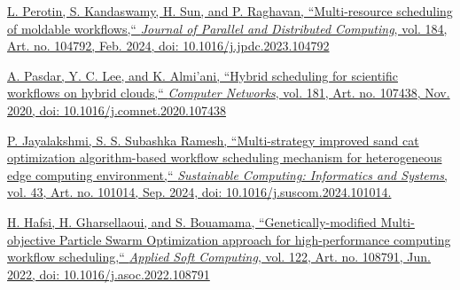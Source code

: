 \documentclass[a4paper, final]{article}
\begin{document}
\begin{thebibliography}{0}
    \href{https://doi.org/10.1016/j.jpdc.2023.104792}{
    L. Perotin, S. Kandaswamy, H. Sun, and P. Raghavan,
    ``Multi-resource scheduling of moldable workflows,``  
    \textit{Journal of Parallel and Distributed Computing}, vol. 184, Art. no. 104792, Feb. 2024,
    doi: 10.1016/j.jpdc.2023.104792
    }
    
	\href{https://doi.org/10.1016/j.comnet.2020.107438}{
    A. Pasdar, Y. C. Lee, and K. Almi’ani,
    ``Hybrid scheduling for scientific workflows on hybrid clouds,``
    \textit{Computer Networks}, vol. 181, Art. no. 107438, Nov. 2020,
    doi: 10.1016/j.comnet.2020.107438
    }
    
    \href{https://doi.org/10.1016/j.suscom.2024.101014}{
    P. Jayalakshmi, S. S. Subashka Ramesh,
    ``Multi-strategy improved sand cat optimization algorithm-based workflow scheduling mechanism for
    heterogeneous edge computing environment,``
    \textit{Sustainable Computing: Informatics and Systems}, vol. 43, Art. no. 101014, Sep. 2024,
    doi: 10.1016/j.suscom.2024.101014.
    }
    
	\href{https://doi.org/10.1016/j.asoc.2022.108791}{
    H. Hafsi, H. Gharsellaoui, and S. Bouamama,
    ``Genetically-modified Multi-objective Particle Swarm Optimization approach for high-performance 
    computing workflow scheduling,``
    \textit{Applied Soft Computing}, vol. 122, Art. no. 108791, Jun. 2022,
    doi: 10.1016/j.asoc.2022.108791
    }
\end{thebibliography}


\newpage
\end{document}
